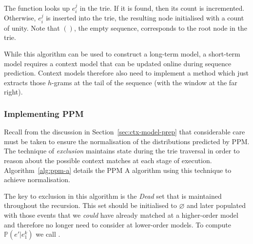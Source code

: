 \documentclass[12pt,a4paper,twoside,openright]{report}
\begin{document}
The function  looks up $e_i^j$ in the trie. If
it is found, then its count is incremented. Otherwise, $e_i^j$ is inserted into
the trie, the resulting node initialised with a count of unity. Note that $()$,
the empty sequence, corresponds to the root node in the trie.

While this algorithm can be used to construct a long-term model, a short-term
model requires a context model that can be updated online during sequence
prediction. Context models therefore also need to implement a method which just
extracts those $h$-grams at the tail of the sequence (with the window at the far
right).

\subsubsection{Implementing PPM}

Recall from the discussion in Section~\ref{sec:ctx-model-prep} that considerable
care must be taken to ensure the normalisation of the distributions predicted by
PPM. The technique of \emph{exclusion} maintains state during the trie traversal
in order to reason about the possible context matches at each stage of
execution. Algorithm~\ref{alg:ppm-a} details the PPM A algorithm using this
technique to achieve normalisation.

The key to exclusion in this algorithm is the \textit{Dead} set that
is maintained throughout the recursion. This set should be initialised to
$\varnothing$ and later populated with those events that we \emph{could} have
already matched at a higher-order model and therefore no longer need to consider
at lower-order models. To compute $\mathbb{P}(e' | e_1^k)$ we call
.
\end{document}
